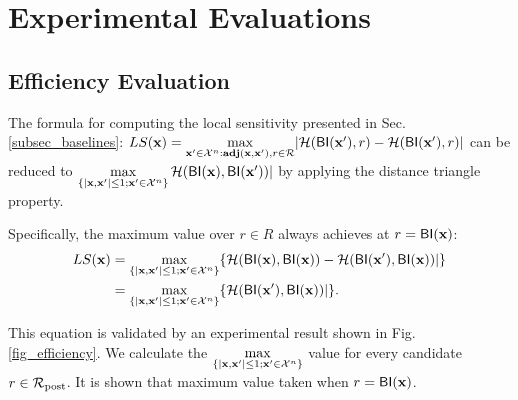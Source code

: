 \documentclass{article}
\begin{document}



\section{Experimental Evaluations}
\label{sec_experiment}

\subsection{Efficiency Evaluation}
\label{subsec_effi}
The formula for computing the local sensitivity presented in Sec. \ref{subsec_baselines}: $LS(\textbf{x})=\max\limits_{\textbf{x}' \in \mathcal{X}^n:\textbf{adj}(\textbf{x},\textbf{x}'), r\in \mathcal{R}}\lvert \mathcal{H}(\mathsf{BI}(\textbf{x}'), r) - \mathcal{H}(\mathsf{BI}(\textbf{x}'), r)\rvert$ 
can be reduced to $\max\limits_{\{|\textbf{x},\textbf{x}'| \leq 1; \textbf{x}'\in \mathcal{X}^n\}}\mathcal{H}(\mathsf{BI}(\textbf{x}), \mathsf{BI}(\textbf{x}'))|$
by applying the distance triangle property. 

Specifically, the maximum value over ${r \in R}$ always achieves at $r = \mathsf{BI}(\textbf{x})$:
\begin{equation*}
\begin{split}
LS(\textbf{x}) 
  & = \max\limits_{\{|\textbf{x},\textbf{x}'| \leq 1;\textbf{x}'\in \mathcal{X}^n\}} \{\mathcal{H}(\mathsf{BI}(\textbf{x}), \mathsf{BI}(\textbf{x})) - \mathcal{H}(\mathsf{BI}(\textbf{x}'), \mathsf{BI}(\textbf{x}))|\} \\
  & = \max\limits_{\{|\textbf{x},\textbf{x}'| \leq 1;\textbf{x}'\in \mathcal{X}^n\}} \{\mathcal{H}(\mathsf{BI}(\textbf{x}'), \mathsf{BI}(\textbf{x}))|\}.
\end{split}
\end{equation*}

This equation is validated by an experimental result shown in Fig. \ref{fig_efficiency}. We calculate the $\max\limits_{\{|\textbf{x},\textbf{x}'| \leq 1;\textbf{x}'\in \mathcal{X}^n\}}$ value for every candidate $r \in \mathcal{R}_{\textup{post}}$. It is shown that maximum value taken when  $r = \mathsf{BI}(\textbf{x})$.
\end{document}
